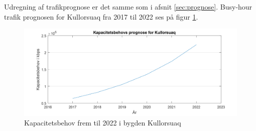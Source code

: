 Udregning af trafikprognose er det samme som i afsnit \ref{sec:prognose}. Busy-hour trafik prognosen for Kullorsuaq fra 2017 til 2022 ses på figur \ref{fig:kapBehovKullorsuaq}.
\begin{figure}[!h]
	\centering
	\includegraphics[width=1\textwidth]{figure/kapBehovKullorsuaq.pdf}
	\caption{Kapacitetsbehov frem til 2022 i bygden Kullorsuaq}
	\label{fig:kapBehovKullorsuaq}
\end{figure}